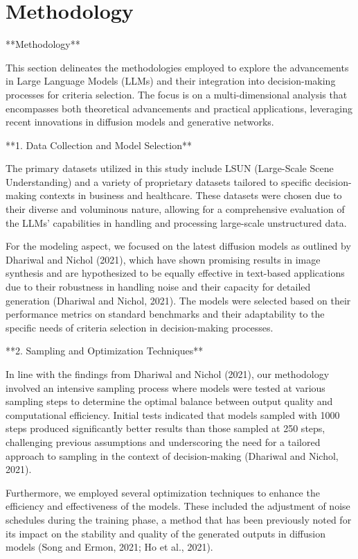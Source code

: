 \documentclass[conference]{IEEEtran}
\begin{document}
\section{Methodology}

**Methodology**

This section delineates the methodologies employed to explore the advancements in Large Language Models (LLMs) and their integration into decision-making processes for criteria selection. The focus is on a multi-dimensional analysis that encompasses both theoretical advancements and practical applications, leveraging recent innovations in diffusion models and generative networks.

**1. Data Collection and Model Selection**

The primary datasets utilized in this study include LSUN (Large-Scale Scene Understanding) and a variety of proprietary datasets tailored to specific decision-making contexts in business and healthcare. These datasets were chosen due to their diverse and voluminous nature, allowing for a comprehensive evaluation of the LLMs' capabilities in handling and processing large-scale unstructured data.

For the modeling aspect, we focused on the latest diffusion models as outlined by Dhariwal and Nichol (2021), which have shown promising results in image synthesis and are hypothesized to be equally effective in text-based applications due to their robustness in handling noise and their capacity for detailed generation (Dhariwal and Nichol, 2021). The models were selected based on their performance metrics on standard benchmarks and their adaptability to the specific needs of criteria selection in decision-making processes.

**2. Sampling and Optimization Techniques**

In line with the findings from Dhariwal and Nichol (2021), our methodology involved an intensive sampling process where models were tested at various sampling steps to determine the optimal balance between output quality and computational efficiency. Initial tests indicated that models sampled with 1000 steps produced significantly better results than those sampled at 250 steps, challenging previous assumptions and underscoring the need for a tailored approach to sampling in the context of decision-making (Dhariwal and Nichol, 2021).

Furthermore, we employed several optimization techniques to enhance the efficiency and effectiveness of the models. These included the adjustment of noise schedules during the training phase, a method that has been previously noted for its impact on the stability and quality of the generated outputs in diffusion models (Song and Ermon, 2021; Ho et al., 2021).
\end{document}

